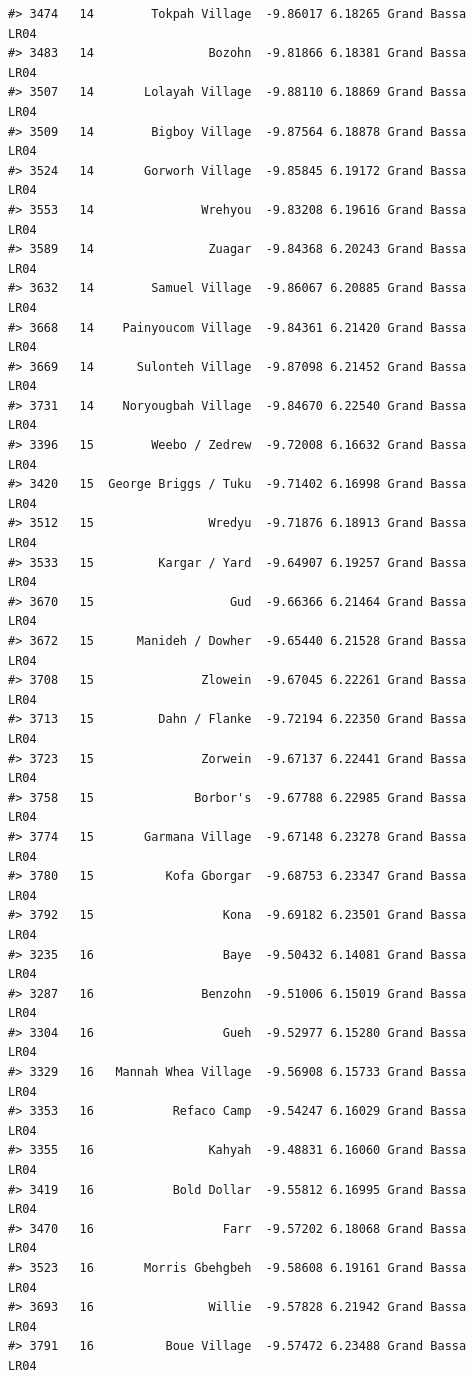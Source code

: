 \documentclass[12pt,a4paper]{book}
\theoremstyle{definition}
\theoremstyle{definition}
\theoremstyle{definition}
\theoremstyle{remark}
\begin{document}
\begin{verbatim}
#> 3474   14        Tokpah Village  -9.86017 6.18265 Grand Bassa       LR04
#> 3483   14                Bozohn  -9.81866 6.18381 Grand Bassa       LR04
#> 3507   14       Lolayah Village  -9.88110 6.18869 Grand Bassa       LR04
#> 3509   14        Bigboy Village  -9.87564 6.18878 Grand Bassa       LR04
#> 3524   14       Gorworh Village  -9.85845 6.19172 Grand Bassa       LR04
#> 3553   14               Wrehyou  -9.83208 6.19616 Grand Bassa       LR04
#> 3589   14                Zuagar  -9.84368 6.20243 Grand Bassa       LR04
#> 3632   14        Samuel Village  -9.86067 6.20885 Grand Bassa       LR04
#> 3668   14    Painyoucom Village  -9.84361 6.21420 Grand Bassa       LR04
#> 3669   14      Sulonteh Village  -9.87098 6.21452 Grand Bassa       LR04
#> 3731   14    Noryougbah Village  -9.84670 6.22540 Grand Bassa       LR04
#> 3396   15        Weebo / Zedrew  -9.72008 6.16632 Grand Bassa       LR04
#> 3420   15  George Briggs / Tuku  -9.71402 6.16998 Grand Bassa       LR04
#> 3512   15                Wredyu  -9.71876 6.18913 Grand Bassa       LR04
#> 3533   15         Kargar / Yard  -9.64907 6.19257 Grand Bassa       LR04
#> 3670   15                   Gud  -9.66366 6.21464 Grand Bassa       LR04
#> 3672   15      Manideh / Dowher  -9.65440 6.21528 Grand Bassa       LR04
#> 3708   15               Zlowein  -9.67045 6.22261 Grand Bassa       LR04
#> 3713   15         Dahn / Flanke  -9.72194 6.22350 Grand Bassa       LR04
#> 3723   15               Zorwein  -9.67137 6.22441 Grand Bassa       LR04
#> 3758   15              Borbor's  -9.67788 6.22985 Grand Bassa       LR04
#> 3774   15       Garmana Village  -9.67148 6.23278 Grand Bassa       LR04
#> 3780   15          Kofa Gborgar  -9.68753 6.23347 Grand Bassa       LR04
#> 3792   15                  Kona  -9.69182 6.23501 Grand Bassa       LR04
#> 3235   16                  Baye  -9.50432 6.14081 Grand Bassa       LR04
#> 3287   16               Benzohn  -9.51006 6.15019 Grand Bassa       LR04
#> 3304   16                  Gueh  -9.52977 6.15280 Grand Bassa       LR04
#> 3329   16   Mannah Whea Village  -9.56908 6.15733 Grand Bassa       LR04
#> 3353   16           Refaco Camp  -9.54247 6.16029 Grand Bassa       LR04
#> 3355   16                Kahyah  -9.48831 6.16060 Grand Bassa       LR04
#> 3419   16           Bold Dollar  -9.55812 6.16995 Grand Bassa       LR04
#> 3470   16                  Farr  -9.57202 6.18068 Grand Bassa       LR04
#> 3523   16       Morris Gbehgbeh  -9.58608 6.19161 Grand Bassa       LR04
#> 3693   16                Willie  -9.57828 6.21942 Grand Bassa       LR04
#> 3791   16          Boue Village  -9.57472 6.23488 Grand Bassa       LR04

\end{verbatim}
\end{document}

